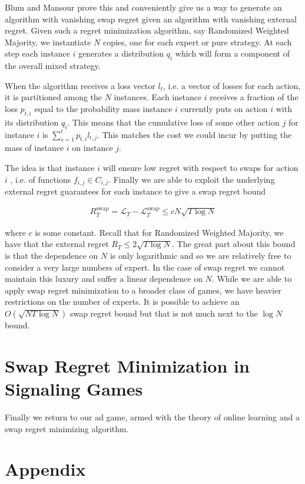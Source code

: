 \documentclass{article}
\begin{document}
Blum and Mansour\cite{blum2007external} prove this and conveniently give us a way to generate an algorithm with vanishing swap regret given an algorithm with vanishing external regret. Given such a regret minimization algorithm, say Randomized Weighted Majority, we instantiate $N$ copies, one for each expert or pure strategy. At each step each instance $i$ generates a distribution $q_i$ which will form a component of the overall mixed strategy.

When the algorithm receives a loss vector $l_t$, i.e. a vector of losses for each action, it is partitioned among the $N$ instances. Each instance $i$ receives a fraction of the loss $p_{t,i}$ equal to the probability mass instance $i$ currently puts on action $i$ with its distribution $q_i$. This means that the cumulative loss of some other action $j$ for instance $i$ is $\sum_{s=1}^t p_{t,i} l_{t,j}$. This matches the cost we could incur by putting the mass of instance $i$ on instance $j$.


The idea is that instance $i$ will ensure low regret with respect to swaps for action $i$ , i.e. of functions $f_{i,j} \in C_{i,j}$. Finally we are able to exploit the underlying external regret guarantees for each instance to give a swap regret bound

\begin{align*}
R_T^{\text{swap}} = \mathcal{L}_T - \mathcal{L}_T^{\text{swap}} \le c N\sqrt{T \log N}
\end{align*}

where $c$ is some constant. Recall that for Randomized Weighted Majority, we have that the external regret $R_T \le 2\sqrt{T \log N}$. The great part about this bound is that the dependence on $N$ is only logarithmic and so we are relatively free to consider a very large numbers of expert. In the case of swap regret we cannot maintain this luxury and suffer a linear dependence on $N$. While we are able to apply swap regret minimization to a broader class of games, we have heavier restrictions on the number of experts. It is possible to achieve an $O(\sqrt{N T \log N})$ swap regret bound but that is not much next to the $\log N$ bound.

\section{Swap Regret Minimization in Signaling Games}

Finally we return to our ad game, armed with the theory of online learning and a swap regret minimizing algorithm. 




\section{Appendix}
\end{document}
